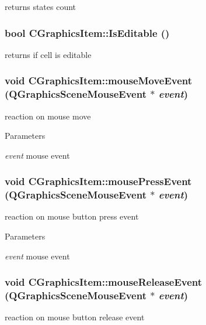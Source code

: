 \label{classCGraphicsItem_af302d0c5f3b0978e34a90b8540de2bc0}
returns states count \hypertarget{classCGraphicsItem_aa116ef0415c22d54e9a56617184d7de8}{
\subsubsection[{IsEditable}]{\setlength{\rightskip}{0pt plus 5cm}bool CGraphicsItem::IsEditable ()}}
\label{classCGraphicsItem_aa116ef0415c22d54e9a56617184d7de8}
returns if cell is editable \hypertarget{classCGraphicsItem_a670472b11f99123fd81cc1f0998405b8}{
\subsubsection[{mouseMoveEvent}]{\setlength{\rightskip}{0pt plus 5cm}void CGraphicsItem::mouseMoveEvent (QGraphicsSceneMouseEvent $\ast$ {\em event})}}
\label{classCGraphicsItem_a670472b11f99123fd81cc1f0998405b8}
reaction on mouse move


\begin{DoxyParams}{Parameters}
\item[{\em event}]mouse event \end{DoxyParams}
\hypertarget{classCGraphicsItem_adbbe3716e050a386328c4c04af24eb22}{
\subsubsection[{mousePressEvent}]{\setlength{\rightskip}{0pt plus 5cm}void CGraphicsItem::mousePressEvent (QGraphicsSceneMouseEvent $\ast$ {\em event})}}
\label{classCGraphicsItem_adbbe3716e050a386328c4c04af24eb22}
reaction on mouse button press event


\begin{DoxyParams}{Parameters}
\item[{\em event}]mouse event \end{DoxyParams}
\hypertarget{classCGraphicsItem_ac264e38927e3a97005305b544344b624}{
\subsubsection[{mouseReleaseEvent}]{\setlength{\rightskip}{0pt plus 5cm}void CGraphicsItem::mouseReleaseEvent (QGraphicsSceneMouseEvent $\ast$ {\em event})}}
\label{classCGraphicsItem_ac264e38927e3a97005305b544344b624}
reaction on mouse button release event


